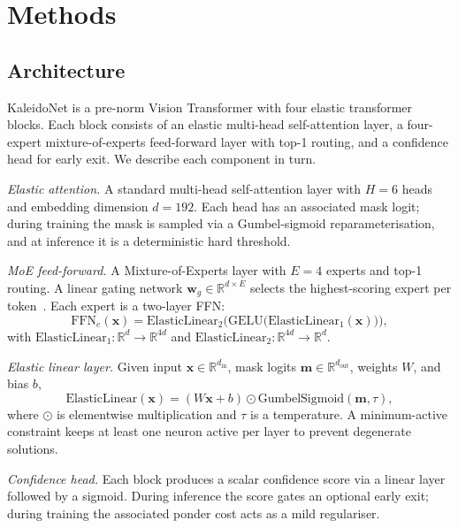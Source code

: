 \documentclass[fleqn,10pt]{article}
\newcommand{\R}{\mathbb{R}}
\newcommand{\bm}{\mathbf{m}}
\newcommand{\bx}{\mathbf{x}}
\newcommand{\bw}{\mathbf{w}}
\begin{document}
\section*{Methods}
\label{sec:methods}

\subsection*{Architecture}

KaleidoNet is a pre-norm Vision Transformer with four elastic
transformer blocks. Each block consists of an elastic multi-head
self-attention layer, a four-expert mixture-of-experts feed-forward
layer with top-1 routing, and a confidence head for early exit. We
describe each component in turn.

\textit{Elastic attention.} A standard multi-head self-attention layer
with $H{=}6$ heads and embedding dimension $d{=}192$. Each head has an
associated mask logit; during training the mask is sampled via a
Gumbel-sigmoid reparameterisation, and at inference it is a
deterministic hard threshold.

\textit{MoE feed-forward.} A Mixture-of-Experts layer with $E{=}4$
experts and top-1 routing. A linear gating network
$\bw_g\in\R^{d\times E}$ selects the highest-scoring expert per
token~\citep{fedus2022switch}. Each expert is a two-layer FFN:
\begin{equation}
\mathrm{FFN}_e(\bx)
  = \mathrm{ElasticLinear}_2\bigl(\mathrm{GELU}\bigl(
       \mathrm{ElasticLinear}_1(\bx)\bigr)\bigr),
\end{equation}
with $\mathrm{ElasticLinear}_1:\R^d\to\R^{4d}$ and
$\mathrm{ElasticLinear}_2:\R^{4d}\to\R^d$.

\textit{Elastic linear layer.} Given input $\bx\in\R^{d_{\mathrm{in}}}$,
mask logits $\bm\in\R^{d_{\mathrm{out}}}$, weights $W$, and bias $b$,
\begin{equation}
\label{eq:elastic}
\mathrm{ElasticLinear}(\bx)
  = (W\bx + b)\odot\mathrm{GumbelSigmoid}(\bm,\tau),
\end{equation}
where $\odot$ is elementwise multiplication and $\tau$ is a
temperature. A minimum-active constraint keeps at least one neuron
active per layer to prevent degenerate solutions.

\textit{Confidence head.} Each block produces a scalar confidence
score via a linear layer followed by a sigmoid. During inference the
score gates an optional early exit; during training the associated
ponder cost acts as a mild regulariser.
\end{document}
